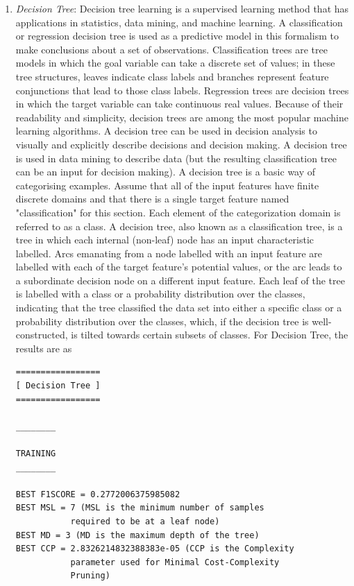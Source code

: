 \documentclass[runningheads]{llncs}
\begin{document}
\begin{enumerate}
\begin{verbatim}
\end{verbatim}
\item \textit{Decision Tree}: Decision tree learning is a supervised learning method that has applications in statistics, data mining, and machine learning. A classification or regression decision tree is used as a predictive model in this formalism to make conclusions about a set of observations. Classification trees are tree models in which the goal variable can take a discrete set of values; in these tree structures, leaves indicate class labels and branches represent feature conjunctions that lead to those class labels. Regression trees are decision trees in which the target variable can take continuous real values. Because of their readability and simplicity, decision trees are among the most popular machine learning algorithms. A decision tree can be used in decision analysis to visually and explicitly describe decisions and decision making. A decision tree is used in data mining to describe data (but the resulting classification tree can be an input for decision making). A decision tree is a basic way of categorising examples. Assume that all of the input features have finite discrete domains and that there is a single target feature named "classification" for this section. Each element of the categorization domain is referred to as a class. A decision tree, also known as a classification tree, is a tree in which each internal (non-leaf) node has an input characteristic labelled. Arcs emanating from a node labelled with an input feature are labelled with each of the target feature's potential values, or the arc leads to a subordinate decision node on a different input feature. Each leaf of the tree is labelled with a class or a probability distribution over the classes, indicating that the tree classified the data set into either a specific class or a probability distribution over the classes, which, if the decision tree is well-constructed, is tilted towards certain subsets of classes. For Decision Tree, the results are as
\begin{verbatim}
=================
[ Decision Tree ]
=================

________

TRAINING
________

BEST F1SCORE = 0.2772006375985082
BEST MSL = 7 (MSL is the minimum number of samples 
           required to be at a leaf node)
BEST MD = 3 (MD is the maximum depth of the tree)
BEST CCP = 2.8326214832388383e-05 (CCP is the Complexity 
           parameter used for Minimal Cost-Complexity 
           Pruning)


\end{verbatim}
\end{enumerate}
\end{document}
